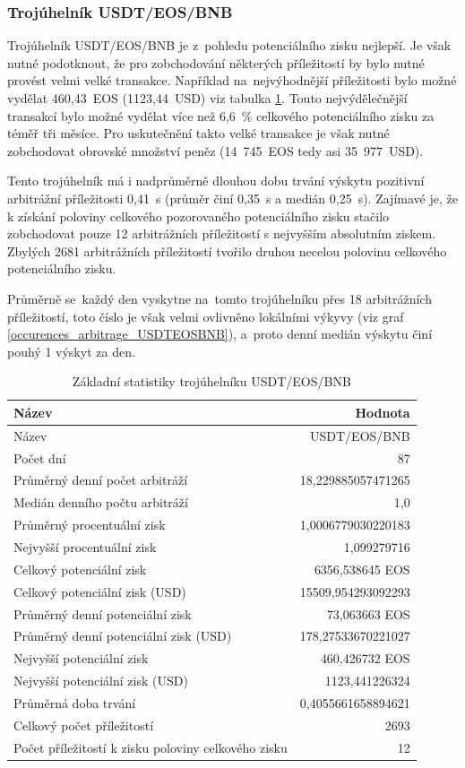 \documentclass[thesis=B,czech]{FITthesis}[2019/03/21]
\begin{document}
\subsubsection{Trojúhelník USDT/EOS/BNB}
Trojúhelník USDT/EOS/BNB je z~pohledu potenciálního zisku nejlepší. Je však nutné podotknout, že pro zobchodování některých příležitostí by bylo nutné provést velmi velké transakce. Například na~nejvýhodnější příležitosti bylo možné vydělat 460,43~EOS (1123,44~USD) viz tabulka \ref{USDTEOSBNB_stats}. Touto nejvýdělečnější transakcí bylo možné vydělat více než 6,6~\% celkového potenciálního zisku za téměř tři měsíce. Pro uskutečnění takto velké transakce je však nutné zobchodovat obrovské množství peněz (14~745~EOS tedy asi 35~977~USD).

Tento trojúhelník má i nadprůměrně dlouhou dobu trvání výskytu pozitivní arbitrážní příležitosti 0,41~s (průměr činí 0,35~s a medián 0,25~s). Zajímavé je, že k získání poloviny celkového pozorovaného potenciálního zisku stačilo zobchodovat pouze 12 arbitrážních příležitostí s nejvyšším absolutním ziskem. Zbylých 2681 arbitrážních příležitostí tvořilo druhou necelou polovinu celkového potenciálního zisku.

Průměrně se~každý den vyskytne na~tomto trojúhelníku přes 18 arbitrážních příležitostí, toto číslo je však velmi ovlivněno lokálními výkyvy (viz graf \ref{occurences_arbitrage_USDTEOSBNB}), a~proto denní medián výskytu činí pouhý 1 výskyt za den.

\begin{table}\centering
\caption{Základní statistiky trojúhelníku USDT/EOS/BNB}
\label{USDTEOSBNB_stats}
\begin{tabular}{|| l | r ||}
\hline Název & Hodnota \\ 
\hline\hline Název & USDT/EOS/BNB \\ 
\hline Počet dní & 87 \\ 
\hline Průměrný denní počet arbitráží & 18,229885057471265 \\ 
\hline Medián denního počtu arbitráží & 1,0 \\ 
\hline Průměrný procentuální zisk & 1,0006779030220183 \\ 
\hline Nejvyšší procentuální zisk & 1,099279716 \\ 
\hline Celkový potenciální zisk & 6356,538645 EOS \\ 
\hline Celkový potenciální zisk (USD) & 15509,954293092293 \\ 
\hline Průměrný denní potenciální zisk & 73,063663 EOS \\ 
\hline Průměrný denní potenciální zisk (USD) & 178,27533670221027 \\ 
\hline Nejvyšší potenciální zisk & 460,426732 EOS \\ 
\hline Nejvyšší potenciální zisk (USD) & 1123,441226324 \\ 
\hline Průměrná doba trvání & 0,4055661658894621 \\ 
\hline Celkový počet příležitostí & 2693 \\ 
\hline Počet příležitostí k zisku poloviny celkového zisku & 12 \\ 
\hline
\end{tabular}
\end{table}
\end{document}
